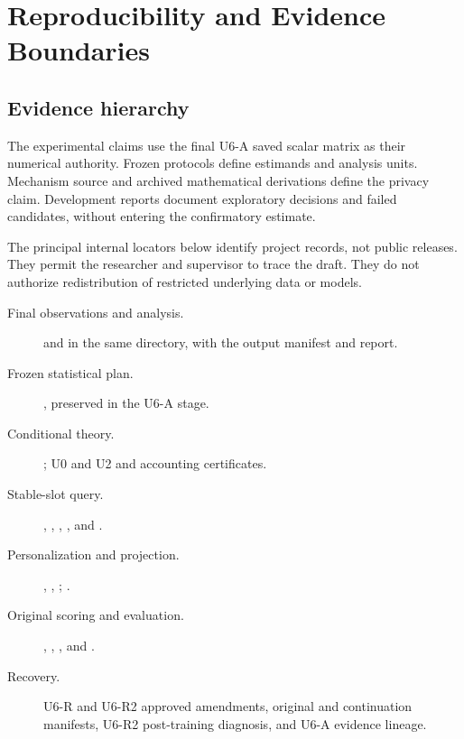 \chapter{Reproducibility and Evidence Boundaries}\label{app:evidence}
\section{Evidence hierarchy}
The experimental claims use the final U6-A saved scalar matrix as their numerical authority. Frozen protocols define estimands and analysis units. Mechanism source and archived mathematical derivations define the privacy claim. Development reports document exploratory decisions and failed candidates, without entering the confirmatory estimate.

The principal internal locators below identify project records, not public releases. They permit the researcher and supervisor to trace the draft. They do not authorize redistribution of restricted underlying data or models.
\begingroup\small\raggedright
\begin{description}
\item[Final observations and analysis.]  and  in the same directory, with the output manifest and report.
\item[Frozen statistical plan.] , preserved in the U6-A stage.
\item[Conditional theory.] ; U0 and U2  and accounting certificates.
\item[Stable-slot query.] , , , , and .
\item[Personalization and projection.] , , ; .
\item[Original scoring and evaluation.] , , , and .
\item[Recovery.] U6-R and U6-R2 approved amendments, original and continuation manifests, U6-R2 post-training diagnosis, and U6-A evidence lineage.
\end{description}
\endgroup

